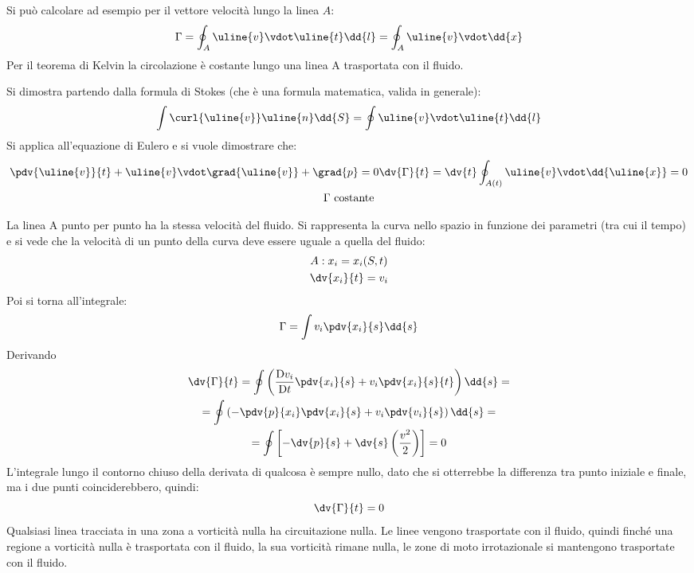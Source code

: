 Si può calcolare ad esempio per il vettore velocità lungo la linea $A$:
%
	\begin{equation*}
		\Gamma = \oint_A \uline{v} \vdot \uline{t} \dd{l} = \oint_A \uline{v} \vdot \dd{x}
	\end{equation*}
%
Per il teorema di Kelvin la circolazione è costante lungo una linea A trasportata con il fluido.

Si dimostra partendo dalla formula di Stokes (che è una formula matematica, valida in generale): 
%      
	\begin{equation*}
			\int \curl{\uline{v}} \uline{n} \dd{S} = \oint \uline{v} \vdot \uline{t} \dd{l}
	\end{equation*}
%			
Si applica all'equazione di Eulero e si vuole dimostrare che:	
%      
	\begin{equation*}
		\begin{gathered}
			\pdv{\uline{v}}{t} + \uline{v} \vdot \grad{\uline{v}} + \grad{p} = 0 
			\dv{\Gamma}{t} = \dv{t} \oint_{A(t)} \uline{v} \vdot \dd{\uline{x}} = 0\\
			\Gamma \text{ costante}
		\end{gathered}
	\end{equation*}
%

La linea A punto per punto ha la stessa velocità del fluido.
Si rappresenta la curva nello spazio in funzione dei parametri (tra cui il tempo) e si vede che la velocità di un punto della curva deve essere uguale a quella del fluido:
%
	\begin{equation*}
		\begin{gathered}
			A: x_i = x_i(S,t)\\
			\dv{x_i}{t} = v_i
		\end{gathered}
	\end{equation*}
%
Poi si torna all'integrale:
%
	\begin{equation*}
		\Gamma = \int v_i \pdv{x_i}{s} \dd{s}
	\end{equation*}
%
Derivando
%
	\begin{equation*}
		\begin{gathered}
			\dv{\Gamma}{t} = \oint \left( \frac{\mathrm{D} v_i}{\mathrm{D} t} \pdv{x_i}{s} + v_i \pdv{x_i}{s}{t} \right) \dd{s} =\\
			= \oint \left( - \pdv{p}{x_i} \pdv{x_i}{s} + v_i \pdv{v_i}{s} \right) \dd{s} = \\
			= \oint \left[ - \dv{p}{s} + \dv{s} \left( \frac{v^2}{2} \right) \right] = 0
		\end{gathered}
	\end{equation*}
%
L'integrale lungo il contorno chiuso della derivata di qualcosa è sempre nullo, dato che si otterrebbe la differenza tra punto iniziale e finale, ma i due punti coinciderebbero, quindi:			
%
	\begin{equation*}			
			\dv{\Gamma}{t} = 0
	\end{equation*}
%
Qualsiasi linea tracciata in una zona a vorticità nulla ha circuitazione nulla.
Le linee vengono trasportate con il fluido, quindi finché una regione a vorticità nulla è trasportata con il fluido, la sua vorticità rimane nulla, le zone di moto irrotazionale si mantengono trasportate con il fluido.

